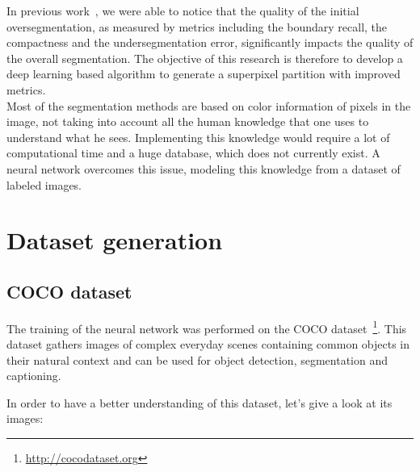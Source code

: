 \documentclass{article}
\begin{document}
            In previous work~\cite{chang_2019}, we were able to notice that the quality of the initial oversegmentation, as measured by metrics including the boundary recall, the compactness and the undersegmentation error, significantly impacts the quality of the overall segmentation. The objective of this research is therefore to develop a deep learning based algorithm to generate a superpixel partition with improved metrics.\\
            Most of the segmentation methods are based on color information of pixels in the image, not taking into account all the human knowledge that one uses to understand what he sees. Implementing this knowledge would require a lot of computational time and a huge database, which does not currently exist. A neural network overcomes this issue, modeling this knowledge from a dataset of labeled images.


\newpage
\section{Dataset generation}
    \subsection{COCO dataset}

        The training of the neural network was performed on the COCO dataset~\cite{microsoft2014}\footnote{\url{http://cocodataset.org}}. This dataset gathers images of complex everyday scenes containing common objects in their natural context and can be used for object detection, segmentation and captioning.
        \par
        In order to have a better understanding of this dataset, let's give a look at its images:
\end{document}
